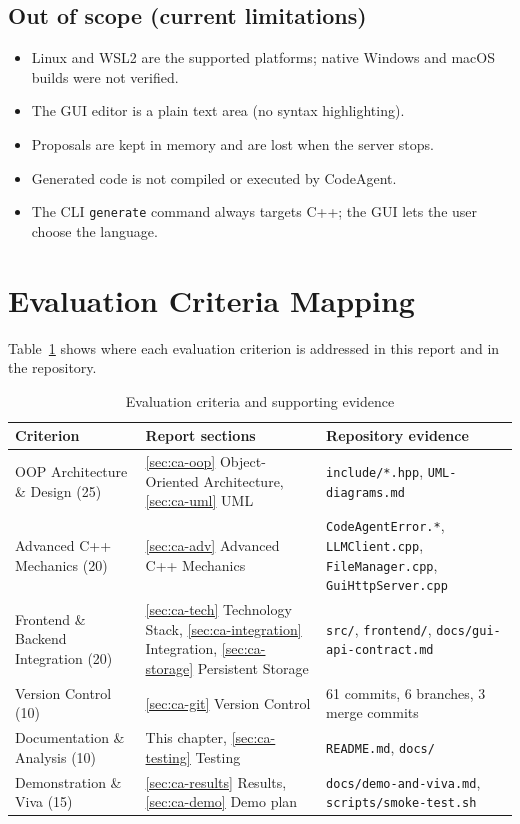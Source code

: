 \documentclass[12pt,a4paper,oneside]{book}
\begin{document}
\subsection*{Out of scope (current limitations)}
\begin{itemize}
  \item Linux and WSL2 are the supported platforms; native Windows and macOS
    builds were not verified.
  \item The GUI editor is a plain text area (no syntax highlighting).
  \item Proposals are kept in memory and are lost when the server stops.
  \item Generated code is not compiled or executed by CodeAgent.
  \item The CLI \texttt{generate} command always targets C++; the GUI lets
    the user choose the language.
\end{itemize}

\section{Evaluation Criteria Mapping}

Table~\ref{tab:ca-rubric} shows where each evaluation criterion is addressed
in this report and in the repository.

\begin{table}[htbp]
\centering\small
\begin{tabular}{|p{3.2cm}|p{5.3cm}|p{5.5cm}|}
\hline
\textbf{Criterion} & \textbf{Report sections} & \textbf{Repository evidence} \\ \hline
OOP Architecture \& Design (25) &
\ref{sec:ca-oop} Object-Oriented Architecture, \ref{sec:ca-uml} UML &
\texttt{include/\allowbreak{}*.hpp}, \texttt{UML-diagrams.md} \\ \hline
Advanced C++ Mechanics (20) &
\ref{sec:ca-adv} Advanced C++ Mechanics &
\texttt{CodeAgentError.*}, \texttt{LLMClient.cpp}, \texttt{FileManager.cpp}, \texttt{GuiHttpServer.cpp} \\ \hline
Frontend \& Backend Integration (20) &
\ref{sec:ca-tech} Technology Stack, \ref{sec:ca-integration} Integration, \ref{sec:ca-storage} Persistent Storage &
\texttt{src/\allowbreak{}}, \texttt{frontend/\allowbreak{}}, \texttt{docs/\allowbreak{}gui-api-contract.md} \\ \hline
Version Control (10) &
\ref{sec:ca-git} Version Control &
61 commits, 6 branches, 3 merge commits \\ \hline
Documentation \& Analysis (10) &
This chapter, \ref{sec:ca-testing} Testing &
\texttt{README.md}, \texttt{docs/\allowbreak{}} \\ \hline
Demonstration \& Viva (15) &
\ref{sec:ca-results} Results, \ref{sec:ca-demo} Demo plan &
\texttt{docs/\allowbreak{}demo-and-viva.md}, \texttt{scripts/\allowbreak{}smoke-test.sh} \\ \hline
\end{tabular}
\caption{Evaluation criteria and supporting evidence}
\label{tab:ca-rubric}
\end{table}
\end{document}
